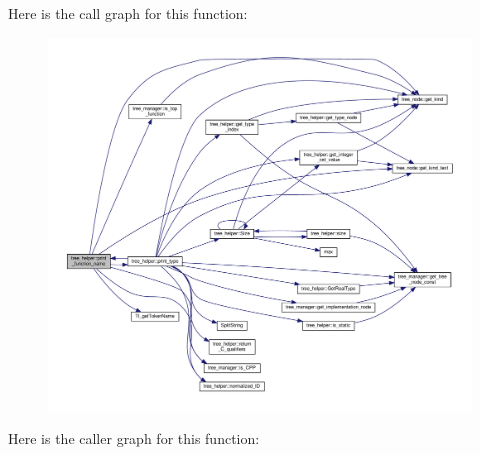 Here is the call graph for this function\+:
\nopagebreak
\begin{figure}[H]
\begin{center}
\leavevmode
\includegraphics[width=350pt]{d7/d99/classtree__helper_a81bf6caaec59373f9e1a5690de590b40_cgraph}
\end{center}
\end{figure}
Here is the caller graph for this function\+:
\nopagebreak
